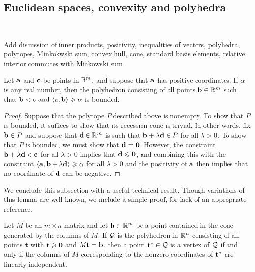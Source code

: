 \documentclass[11pt]{amsart}
\begin{document}


\subsection{Euclidean spaces, convexity and polyhedra} 
\ 


 \alert[inline]{Add discussion of inner products, positivity, inequalities of vectors, polyhedra, polytopes, Minkokwski sum, convex hull, cone, standard basis elements, relative interior commutes with Minkowski sum}


\begin{lemma}  
\label{bounded polytope: L}
Let $\mathbf{a}$ and $\mathbf{c}$ be points in $\mathbb{R}^m$, and suppose that $\mathbf{a}$ has positive coordinates.    If $\alpha$ is any real number, then the polyhedron consisting of all points $\mathbf{b} \in \mathbb{R}^m$ such that  $\mathbf{b} < \mathbf{c} \text{ and } \langle \mathbf{a}, \mathbf{b} \rangle \geqslant \alpha$ is bounded.
\end{lemma}

\begin{proof}  Suppose that the polytope $P$ described above is nonempty.   To show that $P$ is bounded, it suffices to show that its recession cone is trivial.  In other words, fix $\mathbf{b} \in P$ and suppose that $\mathbf{d} \in \mathbb{R}^m$ is such that $\mathbf{b} + \lambda \mathbf{d} \in P$ for all $\lambda > 0$.  To show that $P$ is bounded, we must show that $\mathbf{d} = \mathbf{0}$.   However,  the constraint $\mathbf{b} + \lambda \mathbf{d} < \mathbf{c}$ for all $\lambda>0$ implies that $\mathbf{d} \leqslant \mathbf{0}$, and combining this with the constraint $\langle \mathbf{a}, \mathbf{b} + \lambda \mathbf{d} \rangle \geqslant \alpha$ for all $\lambda > 0$ and the positivity of $\mathbf{a}$ then implies that no coordinate of $\mathbf{d}$ can be negative.
\end{proof}

We conclude this subsection with a useful technical result.  Though variations of this lemma are well-known, we include a simple proof, for lack of an appropriate reference.


\begin{lemma}  
\label{vertex: L}
Let $M$ be an $m \times n$ matrix and let $\mathbf{b} \in \mathbb{R}^m$ be a point contained in the cone generated by the columns of $M$.  If $\mathcal{Q}$ is the polyhedron in $\mathbb{R}^n$  consisting of all points $\mathbf{t}$ with $\mathbf{t} \geqslant \mathbf{0}$ and $M \mathbf{t} = \mathbf{b}$, then a point $\mathbf{t}^{\ast} \in \mathcal{Q}$ is a vertex of $\mathcal{Q}$ if and only if the columns of $M$ corresponding to the nonzero coordinates of $\mathbf{t}^{\ast}$ are linearly independent.  %
\end{lemma}
\end{document}
